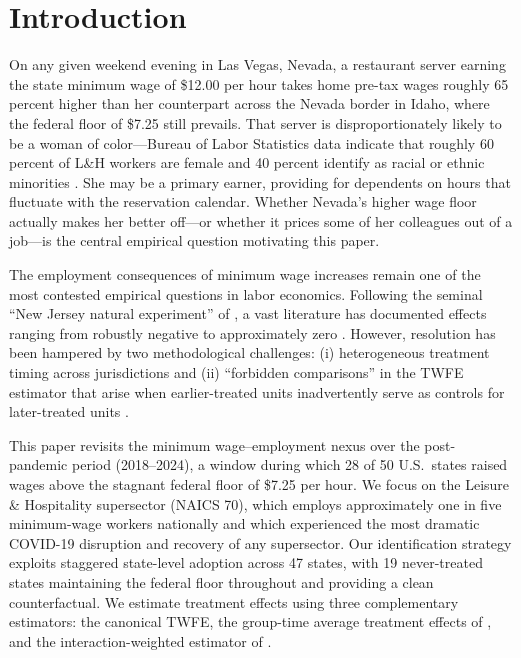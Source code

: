 \documentclass[12pt]{article}
\begin{document}
\section{Introduction}
\label{sec:intro}

On any given weekend evening in Las Vegas, Nevada, a restaurant server
earning the state minimum wage of \$12.00 per hour takes home pre-tax wages
roughly 65 percent higher than her counterpart across the Nevada border in
Idaho, where the federal floor of \$7.25 still prevails.  That server is
disproportionately likely to be a woman of color---Bureau of Labor Statistics
data indicate that roughly 60 percent of L\&H workers are female and 40 percent
identify as racial or ethnic minorities \citep{bls2023characteristics}.  She
may be a primary earner, providing for dependents on hours that fluctuate with
the reservation calendar.  Whether Nevada's higher wage floor actually makes
her better off---or whether it prices some of her colleagues out of a
job---is the central empirical question motivating this paper.

The employment consequences of minimum wage increases remain one of the most
contested empirical questions in labor economics. Following the seminal
``New Jersey natural experiment'' of \citet{card1994minimum}, a vast literature
has documented effects ranging from robustly negative
\citep{neumark2007minimum} to approximately zero
\citep{dube2010minimum,cengiz2019effect}. However, resolution has been
hampered by two methodological challenges: (i) heterogeneous treatment timing
across jurisdictions and (ii) ``forbidden comparisons'' in the TWFE estimator
that arise when earlier-treated units inadvertently serve as controls for
later-treated units \citep{callaway2021difference,sun2021estimating,
goodman-bacon2021difference}.

This paper revisits the minimum wage--employment nexus over the post-pandemic
period (2018--2024), a window during which 28 of 50 U.S.\ states raised wages
above the stagnant federal floor of \$7.25 per hour.  We focus on the Leisure
\& Hospitality supersector (NAICS 70), which employs approximately one in five
minimum-wage workers nationally and which experienced the most dramatic
COVID-19 disruption and recovery of any supersector.  Our identification
strategy exploits staggered state-level adoption across 47 states, with 19
never-treated states maintaining the federal floor throughout and providing a
clean counterfactual.  We estimate treatment effects using three complementary
estimators: the canonical TWFE, the group-time average treatment effects of
\citet{callaway2021difference}, and the interaction-weighted estimator of
\citet{sun2021estimating}.
\end{document}
